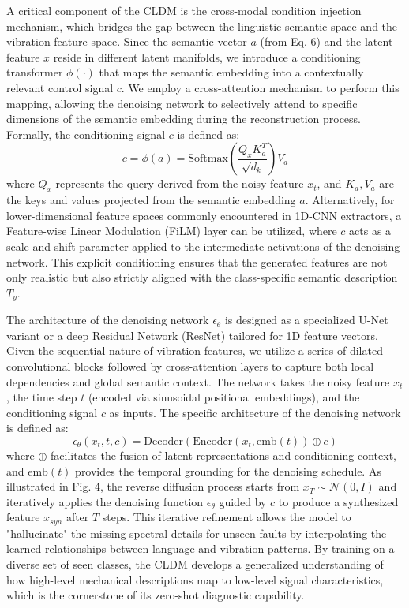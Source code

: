 A critical component of the CLDM is the cross-modal condition injection mechanism, which bridges the gap between the linguistic semantic space and the vibration feature space. Since the semantic vector $a$ (from Eq. 6) and the latent feature $x$ reside in different latent manifolds, we introduce a conditioning transformer $\phi(\cdot)$ that maps the semantic embedding into a contextually relevant control signal $c$. We employ a cross-attention mechanism to perform this mapping, allowing the denoising network to selectively attend to specific dimensions of the semantic embedding during the reconstruction process. Formally, the conditioning signal $c$ is defined as:
\begin{equation}
c = \phi(a) = \text{Softmax}\left(\frac{Q_x K_a^T}{\sqrt{d_k}}\right) V_a
\end{equation}
where $Q_x$ represents the query derived from the noisy feature $x_t$, and $K_a, V_a$ are the keys and values projected from the semantic embedding $a$. Alternatively, for lower-dimensional feature spaces commonly encountered in 1D-CNN extractors, a Feature-wise Linear Modulation (FiLM) layer can be utilized, where $c$ acts as a scale and shift parameter applied to the intermediate activations of the denoising network. This explicit conditioning ensures that the generated features are not only realistic but also strictly aligned with the class-specific semantic description $T_y$.

The architecture of the denoising network $\epsilon_\theta$ is designed as a specialized U-Net variant or a deep Residual Network (ResNet) tailored for 1D feature vectors. Given the sequential nature of vibration features, we utilize a series of dilated convolutional blocks followed by cross-attention layers to capture both local dependencies and global semantic context. The network takes the noisy feature $x_t$, the time step $t$ (encoded via sinusoidal positional embeddings), and the conditioning signal $c$ as inputs. The specific architecture of the denoising network is defined as:
\begin{equation}
\epsilon_\theta(x_t, t, c) = \text{Decoder}\left( \text{Encoder}(x_t, \text{emb}(t)) \oplus c \right)
\end{equation}
where $\oplus$ facilitates the fusion of latent representations and conditioning context, and $\text{emb}(t)$ provides the temporal grounding for the denoising schedule. As illustrated in Fig. 4, the reverse diffusion process starts from $x_T \sim \mathcal{N}(0, I)$ and iteratively applies the denoising function $\epsilon_\theta$ guided by $c$ to produce a synthesized feature $x_{syn}$ after $T$ steps. This iterative refinement allows the model to "hallucinate" the missing spectral details for unseen faults by interpolating the learned relationships between language and vibration patterns. By training on a diverse set of seen classes, the CLDM develops a generalized understanding of how high-level mechanical descriptions map to low-level signal characteristics, which is the cornerstone of its zero-shot diagnostic capability.

